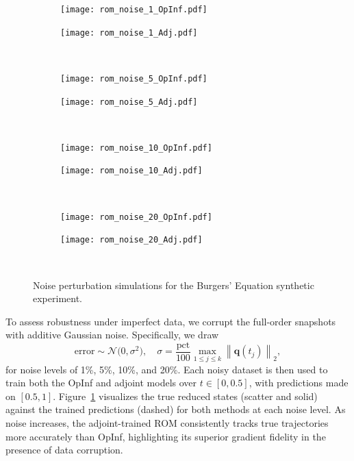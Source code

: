 \begin{figure}[h!]
  \centering
  \begin{subfigure}[c]{0.49\textwidth}
      \centering
      \texttt{[image: rom\_noise\_1\_OpInf.pdf]}
  \end{subfigure}
  \begin{subfigure}[c]{0.49\textwidth}
      \centering
      \texttt{[image: rom\_noise\_1\_Adj.pdf]}
  \end{subfigure} \\[1ex]
    
  \begin{subfigure}[c]{0.49\textwidth}
      \centering
      \texttt{[image: rom\_noise\_5\_OpInf.pdf]}
  \end{subfigure} 
  \begin{subfigure}[c]{0.49\textwidth}
      \centering
      \texttt{[image: rom\_noise\_5\_Adj.pdf]}
  \end{subfigure} \\[1ex]
    
  \begin{subfigure}[c]{0.49\textwidth}
      \centering
      \texttt{[image: rom\_noise\_10\_OpInf.pdf]}
  \end{subfigure} 
  \begin{subfigure}[c]{0.49\textwidth}
      \centering
      \texttt{[image: rom\_noise\_10\_Adj.pdf]}
  \end{subfigure} \\[1ex]
    
  \begin{subfigure}[c]{0.49\textwidth}
      \centering
      \texttt{[image: rom\_noise\_20\_OpInf.pdf]}
  \end{subfigure} 
  \begin{subfigure}[c]{0.49\textwidth}
      \centering
      \texttt{[image: rom\_noise\_20\_Adj.pdf]}
  \end{subfigure} \\[1ex]
  \caption{Noise perturbation simulations for the Burgers' Equation synthetic experiment.}
  \label{fig:five_by_two3}
\end{figure}

\newpage

To assess robustness under imperfect data, we corrupt the full-order snapshots with additive Gaussian noise.  Specifically, we draw\\
$$\mathrm{error} \sim \mathcal{N}\bigl(0,\sigma^2\bigr),
\quad \sigma=\dfrac{\text{pct}}{100}\max_{1 \leq j \leq k} \left\| \mathbf{q}(t_j) \right\|_2,$$ 
for noise levels of 1\%, 5\%, 10\%, and 20\%.  Each noisy dataset is then used to train both the OpInf and adjoint models over $t\in[0,0.5]$, with predictions made on $[0.5,1]$. Figure~\ref{fig:five_by_two3} visualizes the true reduced states (scatter and solid) against the trained predictions (dashed) for both methods at each noise level. As noise increases, the adjoint-trained ROM consistently tracks true trajectories more accurately than OpInf, highlighting its superior gradient fidelity in the presence of data corruption.

